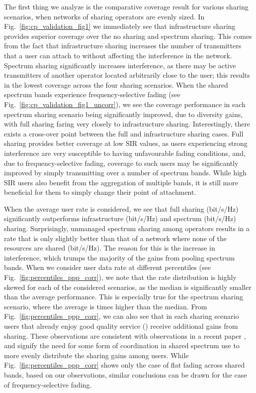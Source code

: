 \documentclass[12pt, journal,doublecolumn, final]{IEEEtran}
\newcommand{\Fig}[1]{Fig.~\ref{fig:#1}}
\begin{document}
The first thing we analyze is the comparative coverage result for various sharing scenarios, when networks of sharing operators are evenly sized. In \Fig{cp_validation_fig1} we immediately see that infrastructure sharing provides superior coverage over the no sharing and spectrum sharing. This comes from the fact that infrastructure sharing increases the number of transmitters that a user can attach to without affecting the interference in the network. Spectrum sharing significantly increases interference, as there may be active transmitters of another operator located arbitrarily close to the user; this results in the lowest coverage across the four sharing scenarios. When the shared spectrum bands experience frequency-selective fading (see \Fig{cp_validation_fig1_uncorr}), we see the coverage performance in each spectrum sharing scenario being significantly improved, due to diversity gains, with full sharing faring very closely to infrastructure sharing. Interestingly, there exists a cross-over point between the full and infrastructure sharing cases. Full sharing provides better coverage at low \ac{SIR} values, as users experiencing strong interference are very susceptible to having unfavourable fading conditions, and, due to frequency-selective fading, coverage to such users may be significantly improved by simply transmitting over a number of spectrum bands. While high \ac{SIR} users also benefit from the aggregation of multiple bands, it is still more beneficial for them to simply change their point of attachment.

When the average user rate is considered, we see that full sharing (\unit[]{bit/s/Hz}) significantly outperforms infrastructure (\unit[]{bit/s/Hz}) and spectrum (\unit[]{bit/s/Hz}) sharing. Surprisingly, unmanaged spectrum sharing among operators results in a rate that is only slightly better than that of a network where none of the resources are shared (\unit[]{bit/s/Hz}). The reason for this is the increase in interference, which trumps the majority of the gains from pooling spectrum bands. When we consider user data rate at different percentiles (see \Fig{percentiles_ppp_corr}), we note that the rate distribution is highly skewed for each of the considered scenarios, as the median is significantly smaller than the average performance. This is especially true for the spectrum sharing scenario, where the average is  times higher than the median. From \Fig{percentiles_ppp_corr}, we can also see that in each sharing scenario users that already enjoy good quality service () receive additional gains from sharing. These observations are consistent with observations in a recent paper \cite{BoccardiShokri-GhadikolaeiFodorEtAl_2016}, and signify the need for some form of coordination in shared spectrum use to more evenly distribute the sharing gains among users. While \Fig{percentiles_ppp_corr} shows only the case of flat fading across shared bands, based on our observations, similar conclusions can be drawn for the case of frequency-selective fading.
\end{document}
